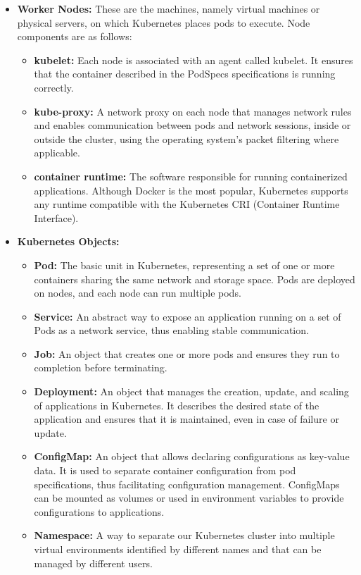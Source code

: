 \begin{itemize}
    \item \textbf{Worker Nodes:} These are the machines, namely virtual machines or physical servers, on which Kubernetes places pods to execute. Node components are as follows:
    \begin{itemize}
        \item[-] \textbf{kubelet:} Each node is associated with an agent called kubelet. It ensures that the container described in the PodSpecs specifications is running correctly.
        \item[-] \textbf{kube-proxy:} A network proxy on each node that manages network rules and enables communication between pods and network sessions, inside or outside the cluster, using the operating system's packet filtering where applicable.
        \item[-] \textbf{container runtime:} The software responsible for running containerized applications. Although Docker is the most popular, Kubernetes supports any runtime compatible with the Kubernetes CRI (Container Runtime Interface).
    \end{itemize}

    \item \textbf{Kubernetes Objects:}
    \begin{itemize}
        \item[-] \textbf{Pod:} The basic unit in Kubernetes, representing a set of one or more containers sharing the same network and storage space. Pods are deployed on nodes, and each node can run multiple pods.
        \item[-] \textbf{Service:} An abstract way to expose an application running on a set of Pods as a network service, thus enabling stable communication.
        \item[-] \textbf{Job:} An object that creates one or more pods and ensures they run to completion before terminating.
        \item[-] \textbf{Deployment:} An object that manages the creation, update, and scaling of applications in Kubernetes. It describes the desired state of the application and ensures that it is maintained, even in case of failure or update.
        \item[-] \textbf{ConfigMap:} An object that allows declaring configurations as key-value data. It is used to separate container configuration from pod specifications, thus facilitating configuration management. ConfigMaps can be mounted as volumes or used in environment variables to provide configurations to applications.
        \item[-] \textbf{Namespace:} A way to separate our Kubernetes cluster into multiple virtual environments identified by different names and that can be managed by different users.
    \end{itemize}
\end{itemize}

